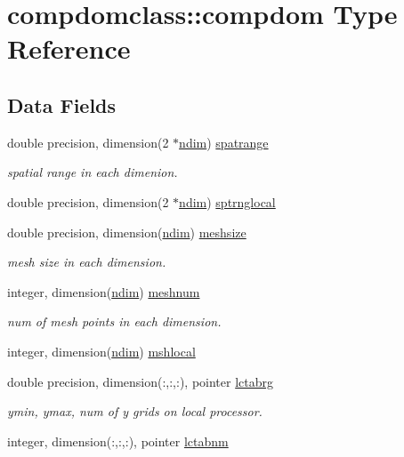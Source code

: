 \hypertarget{structcompdomclass_1_1compdom}{}\section{compdomclass\+::compdom Type Reference}
\label{structcompdomclass_1_1compdom}
\subsection*{Data Fields}
\begin{DoxyCompactItemize}
\item 
double precision, dimension(2 $\ast$\mbox{\hyperlink{namespacecompdomclass_a01f031d8af670f66db4484cd6411e99f}{ndim}}) \mbox{\hyperlink{structcompdomclass_1_1compdom_a55068267999d67699122c91b366a0682}{spatrange}}
\begin{DoxyCompactList}\small\item\em spatial range in each dimenion. \end{DoxyCompactList}\item 
double precision, dimension(2 $\ast$\mbox{\hyperlink{namespacecompdomclass_a01f031d8af670f66db4484cd6411e99f}{ndim}}) \mbox{\hyperlink{structcompdomclass_1_1compdom_a2a2654ff7dd41dbb57b11a089e568123}{sptrnglocal}}
\item 
double precision, dimension(\mbox{\hyperlink{namespacecompdomclass_a01f031d8af670f66db4484cd6411e99f}{ndim}}) \mbox{\hyperlink{structcompdomclass_1_1compdom_a13c6277e9ca60fa6a80081b2a0bc91ff}{meshsize}}
\begin{DoxyCompactList}\small\item\em mesh size in each dimension. \end{DoxyCompactList}\item 
integer, dimension(\mbox{\hyperlink{namespacecompdomclass_a01f031d8af670f66db4484cd6411e99f}{ndim}}) \mbox{\hyperlink{structcompdomclass_1_1compdom_a80b917ff817964bc120175119768f93e}{meshnum}}
\begin{DoxyCompactList}\small\item\em num of mesh points in each dimension. \end{DoxyCompactList}\item 
integer, dimension(\mbox{\hyperlink{namespacecompdomclass_a01f031d8af670f66db4484cd6411e99f}{ndim}}) \mbox{\hyperlink{structcompdomclass_1_1compdom_a21d05738eabd33f56f26879055af6343}{mshlocal}}
\item 
double precision, dimension(\+:,\+:,\+:), pointer \mbox{\hyperlink{structcompdomclass_1_1compdom_a339ff58ad4edb52e01cf217b9a7f081c}{lctabrg}}
\begin{DoxyCompactList}\small\item\em ymin, ymax, num of y grids on local processor. \end{DoxyCompactList}\item 
integer, dimension(\+:,\+:,\+:), pointer \mbox{\hyperlink{structcompdomclass_1_1compdom_aebcef97b10bb06dc69848b22acaffe70}{lctabnm}}
\end{DoxyCompactItemize}


